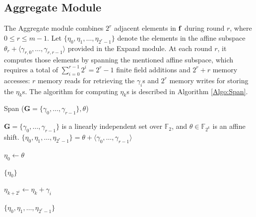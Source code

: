 \clearpage
\subsection{Aggregate Module}

The \textsf{Aggregate} module combines $2^r$ adjacent elements in ${\bf{f}}$ during round $r$, where $0 \leq r \leq m-1$. Let $\{\eta_0, \eta_1, \ldots, \eta_{2^{r}-1} \}$ denote the elements in the affine subspace $\theta_r + \langle \gamma_{r,0}, \ldots, \gamma_{r,r-1} \rangle$ provided in the \textsf{Expand} module. At each round $r$, it computes those elements by spanning the mentioned affine subspace, which requires a total of $\sum_{i=0}^{r-1} 2^i = 2^r -1$ finite field additions and $2^r + r$ memory accesses: $r$ memory reads for retrieving the $\gamma_i$s and $2^r$ memory writes for storing the $\eta_k$s. The algorithm for computing $\eta_k$s is described in Algorithm \ref{Algo:Span}.


\begin{algorithm}[htb]
	\caption{\textsf{Span} ($\mathbf{G} = \{\gamma_0, \ldots, \gamma_{r-1}\}, \theta$)}
	\label{Algo:Span}
	\begin{algorithmic}[1]
		\Require $\mathbf{G} = \{\gamma_0, \ldots, \gamma_{r-1}\}$ is a linearly independent set over $\mathbb{F}_2$, and $\theta \in \mathbb{F}_{2^k}$ is an affine shift.
		\Ensure $\{\eta_0, \eta_1, \ldots, \eta_{2^r - 1}\} = \theta + \langle \gamma_0, \ldots, \gamma_{r-1} \rangle$
		
		\State $\eta_0 \gets \theta$
		
		\State \Return $\{\eta_0\}$
		\EndIf
		
		\State $\eta_{k + 2^i} \gets \eta_k + \gamma_i$
		\EndFor
		\EndFor
		
		\State \Return $\{\eta_0, \eta_1, \ldots, \eta_{2^r - 1}\}$
	\end{algorithmic}
\end{algorithm}


